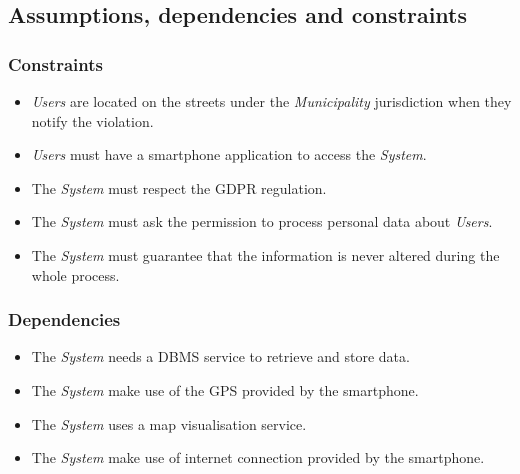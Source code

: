 \documentclass {article}
\begin{document}
	\subsection{Assumptions, dependencies and constraints}
		\subsubsection{Constraints}
		\begin{itemize}
		\item {\it Users} are located on the streets under the {\it Municipality} jurisdiction when they notify the violation.
		\item {\it Users} must have a smartphone application to access the {\it System}.
		\item The {\it System} must respect the GDPR regulation.
		\item The {\it System} must ask the permission to process personal data about {\it Users}.
		\item The {\it System} must guarantee that the information is never altered during the whole process. 
		\end{itemize}
		\subsubsection{Dependencies}
		\begin{itemize}
		\item The {\it System} needs a DBMS service to retrieve and store data.
		\item The {\it System} make use of the GPS provided by the smartphone.
		\item The {\it System} uses a map visualisation service.
		\item The {\it System} make use of internet connection provided by the smartphone.
		\end{itemize}
		
\end{document}
